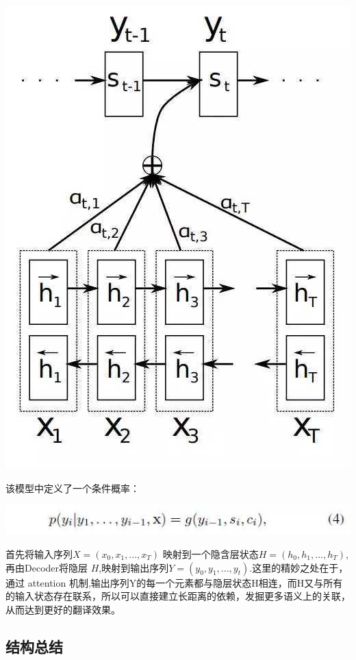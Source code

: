 \documentclass[UTF8,a4paper,10pt]{ctexart}
\begin{document}
    \centerline{\includegraphics[scale=0.3]{pics/190417-s3.jpg}}
    
    
  
    该模型中定义了一个条件概率：

    \centerline{\includegraphics[scale=0.6]{pics/190417-s2.jpg}}
    
    首先将输入序列$X =(x_0, x_1, ...,x_T)$ 映射到一个隐含层状态$H=(h_0, h_1, ...,h_T)$,再由Decoder将隐层 $H$,映射到输出序列$Y=  (y_0, y_1, ...,y_t)$.这里的精妙之处在于，通过 attention 机制,输出序列Y的每一个元素都与隐层状态H相连，而H又与所有的输入状态存在联系，所以可以直接建立长距离的依赖，发掘更多语义上的关联，从而达到更好的翻译效果。

    \subsection{结构总结}
    
\end{document}
